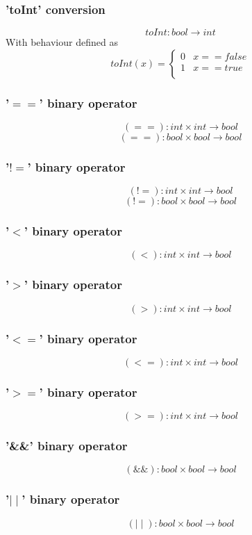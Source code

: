 \documentclass{article}
\begin{document}
\subsubsection{'toInt' conversion}
$$
toInt: bool \longrightarrow int
$$
With behaviour defined as
$$
toInt(x) =  \left\{ \begin{array}{ll}
0 & x == false  \\
1 & x == true \\
\end{array} \right.
$$
\subsubsection{'$==$' binary operator}
$$
(==): int \times int \longrightarrow bool
$$
$$
(==): bool \times bool \longrightarrow bool
$$
\subsubsection{'$!=$' binary operator}
$$
(!=): int \times int \longrightarrow bool
$$
$$
(!=): bool \times bool \longrightarrow bool
$$

\subsubsection{'$<$' binary operator}
$$
(<): int \times int \longrightarrow bool
$$

\subsubsection{'$>$' binary operator}
$$
(>): int \times int \longrightarrow bool
$$
\subsubsection{'$<=$' binary operator}
$$
(<=): int \times int \longrightarrow bool
$$
\subsubsection{'$>=$' binary operator}
$$
(>=): int \times int \longrightarrow bool
$$
\subsubsection{'\&\&' binary operator}
$$
(\&\&): bool \times bool \longrightarrow bool
$$
\subsubsection{'$\mid\mid$' binary operator}
$$
(\mid\mid): bool \times bool \longrightarrow bool
$$
\end{document}
